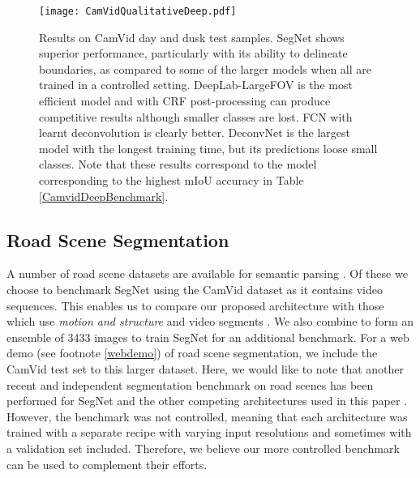 \documentclass[10pt,journal,compsoc]{IEEEtran}
\begin{document}
\begin{figure*}
	\centering
	\texttt{[image: CamVidQualitativeDeep.pdf]}
	\caption{\footnotesize{Results on CamVid day and dusk test samples.
			SegNet shows superior performance, particularly with its ability to delineate boundaries, as compared to some of the larger models when all are trained in a controlled setting. DeepLab-LargeFOV is the most efficient model and with CRF post-processing can produce competitive results although smaller classes are lost. FCN with learnt deconvolution is clearly better. DeconvNet is the largest model with the longest training time, but its predictions loose small classes. Note that these results correspond to the model corresponding to the highest mIoU accuracy in Table \ref{CamvidDeepBenchmark}.
}}
	\label{CamVidQualy}
\end{figure*}



\subsection{Road Scene Segmentation}
\label{CamVid}
A number of road scene datasets are available for semantic parsing \cite{gould2009decomposing,russell2008labelme,GabeDataset,GeigerKITTI}. Of these we choose to benchmark SegNet using the CamVid dataset \cite{GabeDataset} as it contains video sequences. This enables us to compare our proposed architecture with those which use \textit{motion and structure} \cite{LadickyECCV,Sturgess,Brostow} and video segments \cite{tighe2013superparsing}. We also combine \cite{gould2009decomposing,russell2008labelme,GabeDataset,GeigerKITTI} to form an ensemble of 3433 images to train SegNet for an additional benchmark. For a web demo (see footnote \ref{webdemo}) of road scene segmentation, we include the CamVid test set to this larger dataset. 
Here, we would like to note that another recent and independent segmentation benchmark on road scenes has been performed for SegNet and the other competing architectures used in this paper \cite{cordts2016cityscapes}. However, the benchmark was not controlled, meaning that each architecture was trained with a separate recipe with varying input resolutions and sometimes with a validation set included. Therefore, we believe our more controlled benchmark can be used to complement their efforts.
\end{document}
